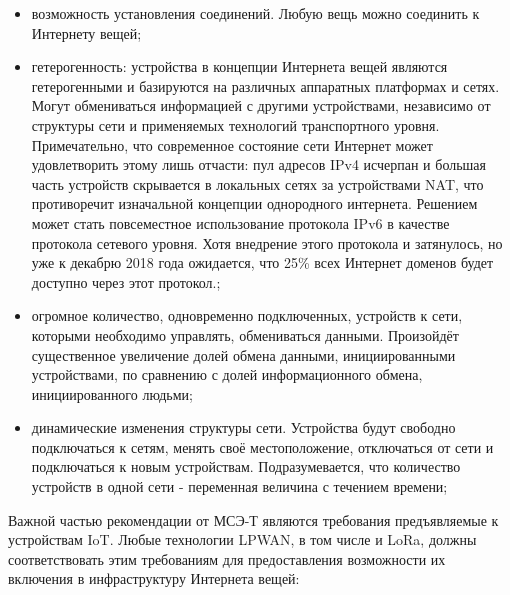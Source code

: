 \begin{itemize}
	\item возможность установления соединений. Любую вещь можно соединить к Интернету вещей;
	\item гетерогенность: устройства в концепции Интернета вещей являются гетерогенными и базируются на различных аппаратных платформах и сетях. 
		Могут обмениваться информацией с другими устройствами, независимо от структуры сети и применяемых технологий транспортного уровня. 
		Примечательно, что современное состояние сети Интернет может удовлетворить этому лишь отчасти: пул адресов IPv4 исчерпан и большая часть устройств скрывается в локальных сетях за устройствами NAT, что противоречит изначальной концепции однородного интернета. 
		Решением может стать повсеместное использование протокола IPv6 в качестве протокола сетевого уровня. 
		Хотя внедрение этого протокола и затянулось, но уже к декабрю 2018 года ожидается, что 25\% всех Интернет доменов будет доступно через этот протокол\cite{pickard2017}.;
	\item огромное количество, одновременно подключенных, устройств к сети, которыми необходимо управлять, обмениваться данными. Произойдёт существенное увеличение долей обмена данными, инициированными устройствами, по сравнению с долей информационного обмена, инициированного людьми;
	\item динамические изменения структуры сети. Устройства будут свободно подключаться к сетям, менять своё местоположение, отключаться от сети и подключаться к новым устройствам. Подразумевается, что количество устройств в одной сети - переменная величина с течением времени;
\end{itemize}

Важной частью рекомендации от МСЭ-Т являются требования	предъявляемые к устройствам IoT. Любые технологии LPWAN, в том числе и LoRa, должны соответствовать этим требованиям для предоставления возможности их включения в инфраструктуру Интернета вещей:

